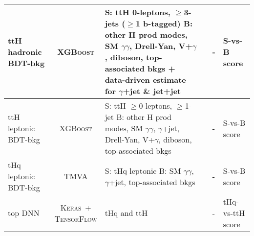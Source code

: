 \begin{tabular}{l|c|m{6cm}<{\centering}|c|m{2.5cm}<{\centering}|m{4.5cm}<{\centering}}
    ttH hadronic BDT-bkg &  \textsc{XGBoost} & \makecell*[{{m{6cm}}}]{\centering S: ttH 0-leptons, $\geq$3-jets ($\geq$1 b-tagged) \\ B: other H prod modes, SM $\gamma\gamma$, Drell-Yan, V+$\gamma$, diboson, top-associated bkgs + data-driven estimate for $\gamma$+jet \& jet+jet} & & - & S-vs-B score \\ \hline
    
    ttH leptonic BDT-bkg &  \textsc{XGBoost} & \makecell*[{{m{6cm}}}]{\centering S: ttH $\geq$0-leptons, $\geq$1-jet \\ B: other H prod modes, SM $\gamma\gamma$, $\gamma$+jet, Drell-Yan, V+$\gamma$, diboson, top-associated bkgs} & & - & S-vs-B score \\ \hline
    
    tHq leptonic BDT-bkg &  \textsc{TMVA} & \makecell*[{{m{6cm}}}]{\centering S: tHq leptonic \\ B: SM $\gamma\gamma$, $\gamma$+jet, top-associated bkgs} & & - & S-vs-B score \\ \hline
    
    top DNN &  \makecell{\textsc{Keras}~+\\\textsc{TensorFlow}} & tHq and ttH & & - & tHq-vs-ttH score \\
\end{tabular}